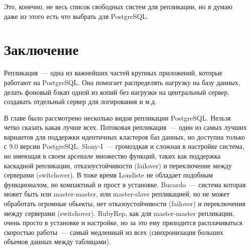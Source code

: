 Это, конечно, не весь список свободных систем для репликации, но я думаю даже из этого есть что выбрать для PostgreSQL.









\section{Заключение}
Репликация~--- одна из важнейших частей крупных приложений, которые работают на PostgreSQL. Она помогает
распределять нагрузку на базу данных, делать фоновый бэкап одной из копий без нагрузки на центральный сервер,
создавать отдельный сервер для логирования и м.д.

В главе было рассмотрено несколько видов репликации PostgreSQL. Нельзя четко сказать какая лучше всех.
Потоковая репликация~--- один из самых лучших вариантов для поддержки идентичных кластеров баз данных,
но доступна только с 9.0 версии PostgreSQL.
Slony-I~--- громоздкая и сложная в настройке система,
но имеющая в своем арсенале множество функций, таких как поддержка каскадной репликации, отказоустойчивости (failover)
и переключение между серверами (switchover). В тоже время Londiste не обладает подобным функционалом,
но компактный и прост в установке. Bucardo~--- система которая может быть или master-master, или
master-slave репликацией, но не может обработать огромные обьекты, нет отказоустойчивости (failover)
и переключения между серверами (switchover). RubyRep, как для master-master репликации,
очень просто в установке и настройке, но за это ему приходится расплачиваться скоростью работы~--- самый
медленный из всех (синхронизация больших объемов данных между таблицами).